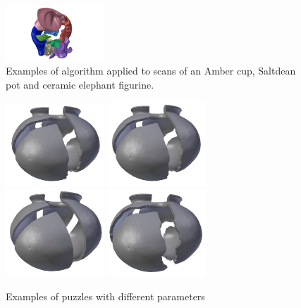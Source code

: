 \documentclass[acmlarge,screen,dvipsnames]{acmart}
\begin{document}
\begin{figure}[h]
  \includegraphics[width=0.33\textwidth]{images/elephantpuzzle4}
  \caption{Examples of algorithm applied to scans of an Amber cup, Saltdean pot and
    ceramic elephant figurine.}
\end{figure}

\begin{figure}[h]    
     \centering
        {\includegraphics[width=0.33\textwidth]{images/all11.jpg}}
        {\includegraphics[width=0.33\textwidth]{images/all22.jpg}}
        {\includegraphics[width=0.33\textwidth]{images/all33.jpg}}
        {\includegraphics[width=0.33\textwidth]{images/all44.jpg}}
      \caption{Examples of puzzles with different parameters}\label{allsettings}
\end{figure}
\end{document}

